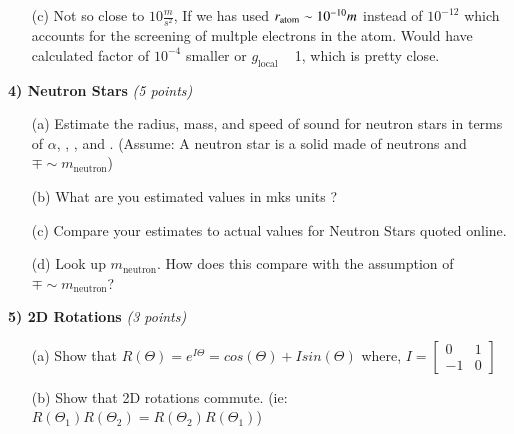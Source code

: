 {\begin{itemize}
{}
\item[(c)]{
Not so close to $10 \frac{m}{s^2}$, If we has used $r_{\textrm{atom}} \sim10^{-10} m$ instead of $10^{-12}$ which accounts for the screening of multple electrons in the atom. 
Would have calculated factor of $10^{-4}$ smaller or $g_\textrm{local}$ ~ 1, which is pretty close.
}

\end{itemize}

\vspace*{0.25in}

\textbf{4) Neutron Stars } \hfill \textit{(5 points)}
\begin{itemize}
\item[(a)]Estimate the radius, mass, and speed of sound for neutron stars in terms of $\alpha$, \aG, \mp, and \me.
(Assume: A neutron star is a solid made of neutrons and $\mp \sim m_{\textrm{neutron}}$)
\item[(b)]What are you estimated values in mks units ?
\item[(c)]Compare your estimates to actual values for Neutron Stars quoted online.
\item[(d)]Look up $m_{\textrm{neutron}}$. How does this compare with the assumption of $\mp \sim m_{\textrm{neutron}}$?
\end{itemize}

\vspace*{0.25in}

\textbf{5) 2D Rotations } \hfill \textit{(3 points)}
\begin{itemize}
\item[(a)]Show that $R(\Theta) = e^{I\Theta} = cos(\Theta)+ I sin(\Theta)$
where, $I =  \begin{bmatrix}
    0 & 1  \\
    -1 & 0
  \end{bmatrix} $

\item[(b)]Show that 2D rotations commute.  (ie: $R(\Theta_{1})R(\Theta_{2}) = R(\Theta_{2})R(\Theta_{1})$)
\end{itemize}
}

\vspace*{0.25in}

